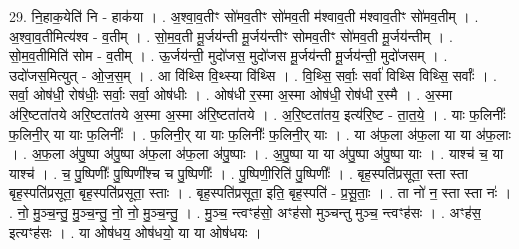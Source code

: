 \documentclass[17pt]{extarticle}
\begin{document}
29. नि॒हाक॒येति॑ नि - हाक॑या । . अ॒श्वा॒व॒तीꣳ सो॑मव॒तीꣳ सो॑मव॒ती म॑श्वाव॒ती म॑श्वाव॒तीꣳ सो॑मव॒तीम् । . अ॒श्वा॒व॒तीमित्य॑श्व - व॒तीम् । . सो॒म॒व॒ती मू॒र्जय॑न्ती मू॒र्जय॑न्तीꣳ सोमव॒तीꣳ सो॑मव॒ती मू॒र्जय॑न्तीम् । . सो॒म॒व॒तीमिति॑ सोम - व॒तीम् । . ऊ॒र्जय॑न्ती॒ मुदो॑जस॒ मुदो॑जस मू॒र्जय॑न्ती मू॒र्जय॑न्ती॒ मुदो॑जसम् । . उदो॑जस॒मित्युत् - ओ॒ज॒स॒म् । . आ वि॑थ्सि वि॒थ्स्या वि॑थ्सि । . वि॒थ्सि॒ सर्वाः॒ सर्वा॑ विथ्सि विथ्सि॒ सर्वाः᳚ । . सर्वा॒ ओष॑धी॒ रोष॑धीः॒ सर्वाः॒ सर्वा॒ ओष॑धीः । . ओष॑धी र॒स्मा अ॒स्मा ओष॑धी॒ रोष॑धी र॒स्मै । . अ॒स्मा अ॑रि॒ष्टता॑तये अरि॒ष्टता॑तये अ॒स्मा अ॒स्मा अ॑रि॒ष्टता॑तये । . अ॒रि॒ष्टता॑तय॒ इत्य॑रि॒ष्ट - ता॒त॒ये॒ । . याः फ॒लिनीः᳚ फ॒लिनी॒र् या याः फ॒लिनीः᳚ । . फ॒लिनी॒र् या याः फ॒लिनीः᳚ फ॒लिनी॒र् याः । . या अ॑फ॒ला अ॑फ॒ला या या अ॑फ॒लाः । . अ॒फ॒ला अ॑पु॒ष्पा अ॑पु॒ष्पा अ॑फ॒ला अ॑फ॒ला अ॑पु॒ष्पाः । . अ॒पु॒ष्पा या या अ॑पु॒ष्पा अ॑पु॒ष्पा याः । . याश्च॑ च॒ या याश्च॑ । . च॒ पु॒ष्पिणीः᳚ पु॒ष्पिणी᳚श्च च पु॒ष्पिणीः᳚ । . पु॒ष्पिणी॒रिति॑ पु॒ष्पिणीः᳚ । . बृह॒स्पति॑प्रसूता॒ स्ता स्ता बृह॒स्पति॑प्रसूता॒ बृह॒स्पति॑प्रसूता॒ स्ताः । . बृह॒स्पति॑प्रसूता॒ इति॒ बृह॒स्पति॑ - प्र॒सू॒ताः॒ । . ता नो॑ न॒ स्ता स्ता नः॑ । . नो॒ मु॒ञ्च॒न्तु॒ मु॒ञ्च॒न्तु॒ नो॒ नो॒ मु॒ञ्च॒न्तु॒ । . मु॒ञ्च॒ न्त्वꣳह॑सो॒ अꣳह॑सो मुञ्चन्तु मुञ्च॒ न्त्वꣳह॑सः । . अꣳह॑स॒ इत्यꣳह॑सः । . या ओष॑धय॒ ओष॑धयो॒ या या ओष॑धयः । \newline
\end{document}
